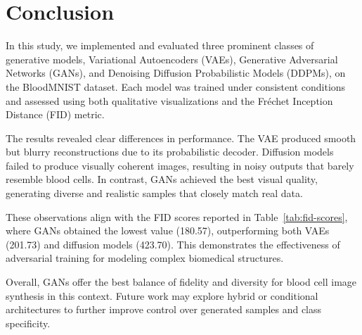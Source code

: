 \section{Conclusion}

In this study, we implemented and evaluated three prominent classes of generative models, Variational Autoencoders (VAEs), Generative Adversarial Networks (GANs), and Denoising Diffusion Probabilistic Models (DDPMs), on the BloodMNIST dataset. Each model was trained under consistent conditions and assessed using both qualitative visualizations and the Fréchet Inception Distance (FID) metric.

The results revealed clear differences in performance. The VAE produced smooth but blurry reconstructions due to its probabilistic decoder. Diffusion models failed to produce visually coherent images, resulting in noisy outputs that barely resemble blood cells. In contrast, GANs achieved the best visual quality, generating diverse and realistic samples that closely match real data.

These observations align with the FID scores reported in Table~\ref{tab:fid-scores}, where GANs obtained the lowest value (180.57), outperforming both VAEs (201.73) and diffusion models (423.70). This demonstrates the effectiveness of adversarial training for modeling complex biomedical structures.

Overall, GANs offer the best balance of fidelity and diversity for blood cell image synthesis in this context. Future work may explore hybrid or conditional architectures to further improve control over generated samples and class specificity.
